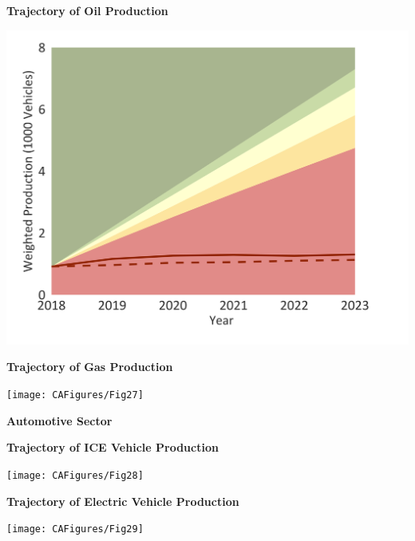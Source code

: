 \documentclass[10pt,table,a4]{article}\usepackage[]{graphicx}\usepackage[]{color}
\begin{document}
	\begin{minipage}[t]{.49\linewidth}
		\textbf{Trajectory of Oil Production }
		
		\includegraphics[trim = {0 0cm 0 0},width=1\linewidth]{CAFigures/Fig26}
		
	\end{minipage}	
	\hspace{.02\linewidth}
	\begin{minipage}[t]{.49\textwidth}
		\textbf{Trajectory of Gas Production }
		
		\texttt{[image: CAFigures/Fig27]}
		
	\end{minipage}
	
	
	\begin{center}
		\textbf{Automotive Sector}
	\end{center}
	
	\begin{minipage}[t]{.49\linewidth}
		\textbf{Trajectory of ICE Vehicle Production}
		
		\texttt{[image: CAFigures/Fig28]}
		
	\end{minipage}	
	\hspace{.02\linewidth}
	\begin{minipage}[t]{.49\textwidth}
		\textbf{Trajectory of Electric Vehicle Production}
		
		\texttt{[image: CAFigures/Fig29]}
		
	\end{minipage}		
	
\end{document}
